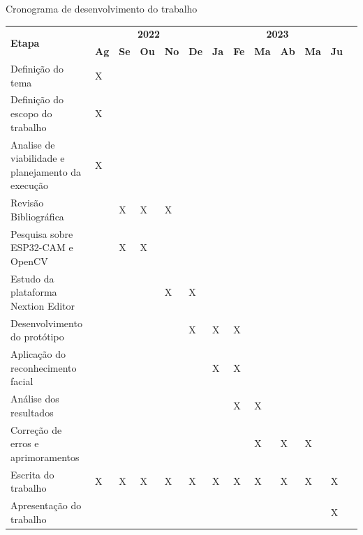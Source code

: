 \begin{tabframed}[htb]
    \caption{Cronograma de desenvolvimento do trabalho}
    \label{quad:quadro1}
    \begin{tabular}{|l|*{12}{p{}|}}
    \hline
    \multirow{2}{*}{\textbf{Etapa}} & \multicolumn{5}{c|}{\textbf{2022}} & \multicolumn{6}{c|}{\textbf{2023}} \\  
    \cline{2-12}
    &\textbf{Ag} &\textbf{Se} &\textbf{Ou} &\textbf{No} &\textbf{De} &\textbf{Ja} &\textbf{Fe} &\textbf{Ma} &\textbf{Ab} &\textbf{Ma} &\textbf{Ju} \\ \hline
    Definição do tema                                 &X & & & & & & & & & & \\   \hline
    Definição do escopo do trabalho                   &X & & & & & & & & & & \\   \hline
    Analise de viabilidade e planejamento da execução &X & & & & & & & & & & \\   \hline
    Revisão Bibliográfica                             & &X &X &X & & & & & & & \\ \hline
    Pesquisa sobre ESP32-CAM e OpenCV                     & &X &X & & & & & & & & \\  \hline
    Estudo da plataforma Nextion Editor               & & & &X &X & & & & & & \\  \hline
    Desenvolvimento do protótipo                      & & & & &X &X &X & & & & \\ \hline
    Aplicação do reconhecimento facial                & & & & & &X &X & & & & \\  \hline
    Análise dos resultados                            & & & & & & &X &X & & & \\  \hline
    Correção de erros e aprimoramentos                & & & & & & & &X &X &X & \\ \hline
    Escrita do trabalho                               &X &X &X &X &X &X &X &X &X &X &X \\ \hline
    Apresentação do trabalho                          & & & & & & & & & & &X \\   \hline
    \end{tabular}
    \fonte{}%
\end{tabframed}
